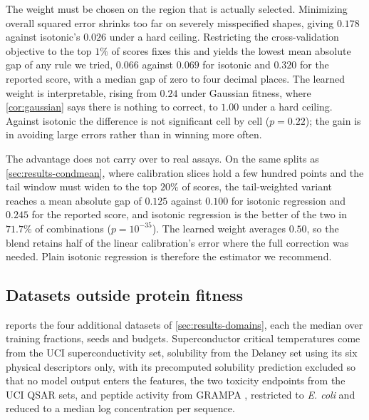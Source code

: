 \documentclass{article}
\theoremstyle{plain}
\theoremstyle{definition}
\begin{document}
The weight must be chosen on the region that is actually selected. Minimizing overall
squared error shrinks too far on severely misspecified shapes, giving $0.178$ against
isotonic's $0.026$ under a hard ceiling. Restricting the cross-validation objective to
the top $1\%$ of scores fixes this and yields the lowest mean absolute gap of any rule
we tried, $0.066$ against $0.069$ for isotonic and $0.320$ for the reported score, with
a median gap of zero to four decimal places. The learned weight is interpretable,
rising from $0.24$ under Gaussian fitness, where \cref{cor:gaussian} says there is
nothing to correct, to $1.00$ under a hard ceiling. Against isotonic the difference is
not significant cell by cell ($p = 0.22$); the gain is in avoiding large errors rather
than in winning more often.

The advantage does not carry over to real assays. On the same splits as
\cref{sec:results-condmean}, where calibration slices hold a few hundred points and the
tail window must widen to the top $20\%$ of scores, the tail-weighted variant reaches a
mean absolute gap of $0.125$ against $0.100$ for isotonic regression and $0.245$ for the
reported score, and isotonic regression is the better of the two in $71.7\%$ of
combinations ($p = 10^{-35}$). The learned weight averages $0.50$, so the blend
retains half of the linear calibration's error where the full correction was needed.
Plain isotonic regression is therefore the estimator we recommend.

\subsection{Datasets outside protein fitness}
\label{app:domains}

 reports the four additional datasets of
\cref{sec:results-domains}, each the median over training fractions, seeds and budgets.
Superconductor critical temperatures come from the UCI superconductivity set, solubility
from the Delaney set using its six physical descriptors only, with its precomputed
solubility prediction excluded so that no model output enters the features, the two
toxicity endpoints from the UCI QSAR sets, and peptide activity from GRAMPA
\citep{witten2019deep}, restricted to \emph{E. coli} and reduced to a median log
concentration per sequence.
\end{document}
